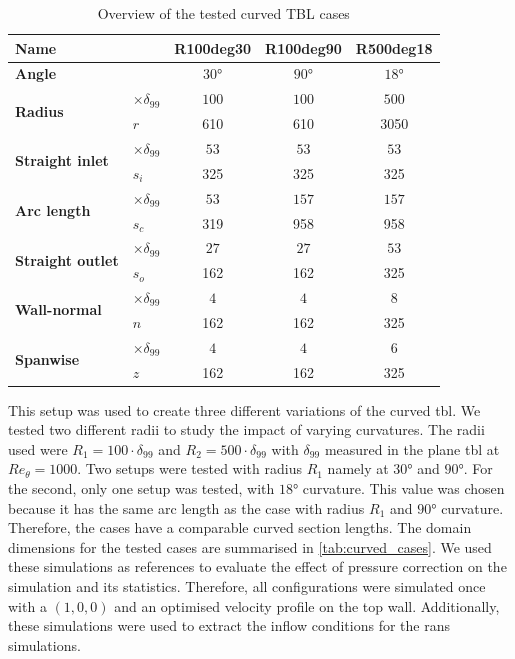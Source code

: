 \begin{table}[!ht]
    \centering
    \caption{Overview of the tested curved TBL cases}
    \label{tab:curved_cases}
    \begin{tabular}{l l c c c}
    \hline
    \textbf{Name} & & \textbf{R100deg30} & \textbf{R100deg90} & \textbf{R500deg18} \\
    \hline
    \multicolumn{2}{l}{\textbf{Angle}} & $30$° & $90$° & $18$° \\
    \hline
    \multirow{2}{*}{\textbf{Radius}} & $\times \delta_{99}$ & $100$ & $100$ & $500$ \\
     & $r$ & 610 & 610 & 3050 \\
    \hline
    \multirow{2}{*}{\textbf{Straight inlet}} & $\times \delta_{99}$ & $53$ & $53$ & $53$ \\
     & $s_{i}$ & 325 & 325 & 325 \\
    \hline
    \multirow{2}{*}{\textbf{Arc length}} & $\times \delta_{99}$ & $53$ & $157$ & $157$ \\
     & $s_c$ & 319 & 958 & 958 \\
    \hline
    \multirow{2}{*}{\textbf{Straight outlet}} & $\times \delta_{99}$ & $27$ & $27$ & $53$ \\
     & $s_o$ & 162 & 162 & 325 \\
    \hline
    \multirow{2}{*}{\textbf{Wall-normal }} & $\times \delta_{99}$ & $4$ & $4$ & $8$ \\
     & $n$ & 162 & 162 & 325 \\
    \hline
    \multirow{2}{*}{\textbf{Spanwise }} & $\times \delta_{99}$ & $4$ & $4$ & $6$ \\
     & $z$ & 162 & 162 & 325 \\
     \hline
    \end{tabular}
\end{table}

This setup was used to create three different variations of the curved \acrshort{tbl}.
We tested two different radii to study the impact of varying curvatures. 
The radii used were  $R_1 = 100 \cdot \delta_{99}$ and $R_2 = 500 \cdot \delta_{99}$ with $\delta_{99}$ measured in the plane \acrshort{tbl} at $Re_{\theta} = 1000$. 
Two setups were tested with radius $R_1$ namely at $30$° and $90$°. 
For the second, only one setup was tested, with $18$° curvature. 
This value was chosen because it has the same arc length as the case with radius $R_1$ and $90$° curvature. 
Therefore, the cases have a comparable curved section lengths.
The domain dimensions for the tested cases are summarised in \autoref{tab:curved_cases}. 
We used these simulations as references to evaluate the effect of pressure correction on the simulation and its statistics.
Therefore, all configurations were simulated once with a $(1,0,0)$ and an optimised velocity profile on the top wall.
Additionally, these simulations were used to extract the inflow conditions for the \acrshort{rans} simulations.

